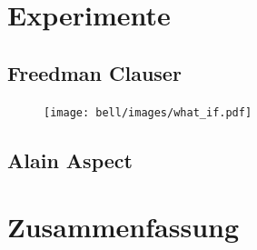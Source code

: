 \begin{refsection}
\section{Experimente}
\subsection{Freedman Clauser}
    
    \begin{figure}[ht!]
        \centering
        \texttt{[image: bell/images/what\_if.pdf]}
    \end{figure}
    
\subsection{Alain Aspect}

\section{Zusammenfassung}


\printbibliography[heading=subbibliography]
\end{refsection}

